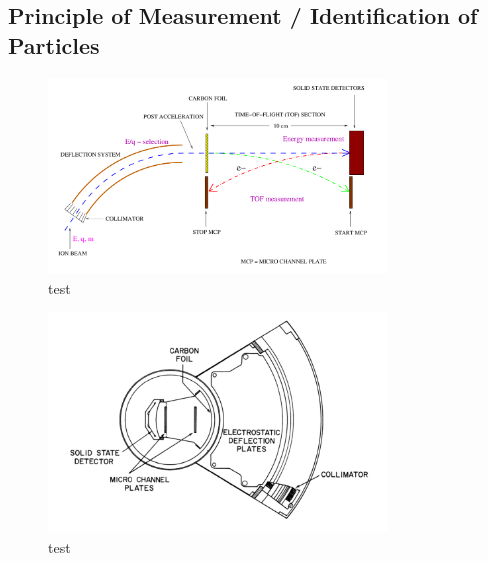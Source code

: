 \subsection{Principle of Measurement / Identification of Particles}
\begin{figure}[h]
	\includegraphics[width=0.8\textwidth]{Figures/Lars_Swics.png}
	\centering
	\caption{test}
	\label{fig:lars_swics}
\end{figure}


\begin{figure}[h]
	\includegraphics[width=0.8\textwidth]{Figures/swics_sensor.pdf}
	\centering
	\caption{test}
	\label{fig:sensor_swics}
\end{figure}
